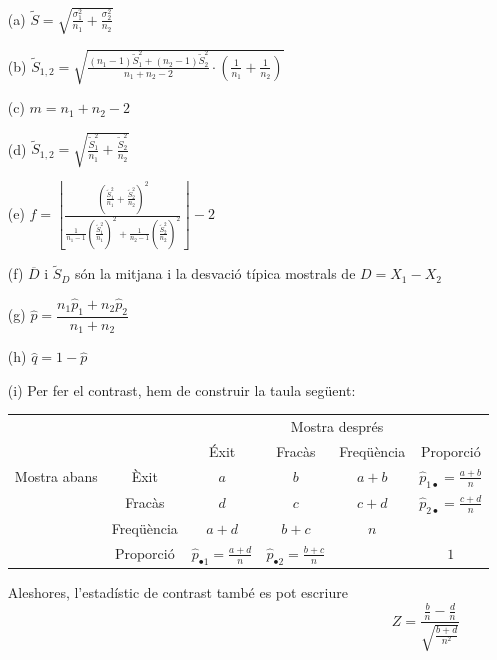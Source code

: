 \documentclass{article}
\begin{document}
\begin{itemize}
\item[(a)] $\widetilde{S}=\displaystyle
\sqrt{\frac{\sigma_1^2}{n_1}+
\frac{\sigma_2^2}{n_2}}$

\item[(b)] $\displaystyle\widetilde{S}_{1,2}=\sqrt{\frac{(n_1
-1)\widetilde{S}_1^2 +(n_2 -1)\widetilde{S}_2^2}{n_1 +n_2
-2}\cdot\left(\frac{1}{n_1}+\frac{1}{n_2}\right)}$

\item[(c)] $m=n_1+n_2-2$

\item[(d)] $\displaystyle\widetilde{S}_{1,2}=\sqrt{\frac{\widetilde{S}_1^2}{n_1}+\frac{\widetilde{S}_2^2}{n_2}}$

\item[(e)] $f=\displaystyle\left\lfloor\frac{ \left( \frac{\widetilde{S}_1^2}{n_1}+\frac{\widetilde{S}_2^2}{n_2}\right)^2}%
{ \frac{1}{n_1-1}\left(\frac{\widetilde{S}_1^2}{n_1}\right)^2+\frac{1}{n_2-1}\left(\frac{\widetilde{S}_2^2}{n_2}\right)^2}\right\rfloor -2$

\item[(f)] $\overline{D}$ i $\widetilde{S}_D$ són la mitjana i la desvació típica mostrals de $D=X_1-X_2$

\item[(g)] $\widehat{p}=\dfrac{n_1 \widehat{p}_1 +n_2\widehat{p}_2}{n_1 +n_2}$

\item[(h)] $\widehat{q}=1-\widehat{p}$

\item[(i)] Per fer el contrast, hem de construir la taula seg\"uent:
\begin{center}
\begin{tabular}{|c|c|c|c|c|c|}
\cline{3-6}
\multicolumn{1}{c}{} & \multicolumn{1}{c|}{} &\multicolumn{4}{c|}{Mostra despr\'es}\\
\cline{3-6} 
\multicolumn{1}{c}{}& \multicolumn{1}{c|}{} & \'Exit & Frac\`as & Freq\"u\`encia & Proporci\'o 
\\\cline{1-6}\cline{2-6}
\multirow{4}{2cm}{Mostra abans}&
 \`Exit & $a$ & $b$ & $a+b$ & $\widehat{p}_{1\bullet}=
\frac{a+b}{n}$\\\cline{2-6}
& Frac\`as & $d$ & $c$ & $c+d$ & $\widehat{p}_{2\bullet}=
\frac{c+d}{n}$\\
\cline{2-6}\cline{2-6}
& Freq\"u\`encia & $a+d$ & $b+c$ & $n$ & \\\cline{2-6}
& Proporci\'o & $\widehat{p}_{\bullet 1}=\frac{a+d}{n}$ & 
$\widehat{p}_{\bullet 2}=\frac{b+c}{n}$ & & $1$ \\\cline{1-6}
\end{tabular}
\end{center}
Aleshores, l'estadístic de contrast també es pot escriure 
$$Z=\frac{\frac{b}{n}-\frac{d}{n}}{\sqrt{\frac{b+d}{n^2}}}$$
\end{itemize}
\end{document}
